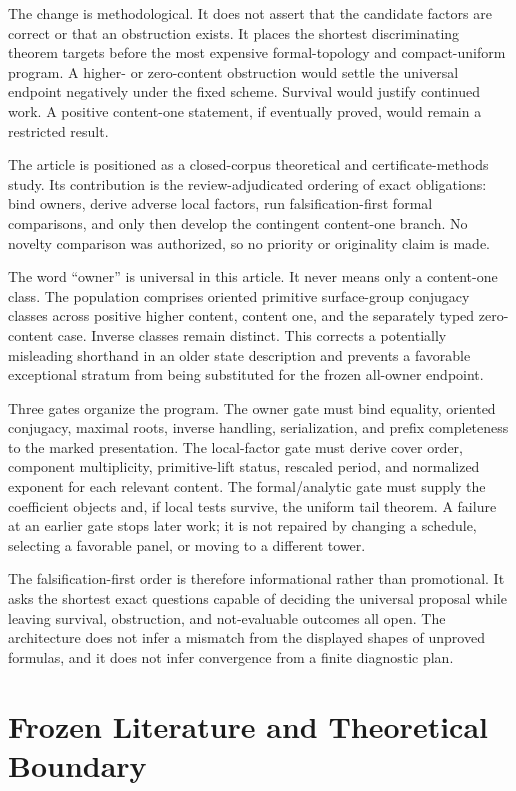 \documentclass[11pt]{article}
\begin{document}
The change is methodological. It does not assert that the candidate
factors are correct or that an obstruction exists. It places the
shortest discriminating theorem targets before the most expensive
formal-topology and compact-uniform program. A higher- or zero-content
obstruction would settle the universal endpoint negatively under the
fixed scheme. Survival would justify continued work. A positive
content-one statement, if eventually proved, would remain a restricted
result.

The article is positioned as a closed-corpus theoretical and
certificate-methods study. Its contribution is the review-adjudicated
ordering of exact obligations: bind owners, derive adverse local
factors, run falsification-first formal comparisons, and only then
develop the contingent content-one branch. No novelty comparison was
authorized, so no priority or originality claim is made.

The word ``owner'' is universal in this article. It never means only a
content-one class. The population comprises oriented primitive
surface-group conjugacy classes across positive higher content, content
one, and the separately typed zero-content case. Inverse classes remain
distinct. This corrects a potentially misleading shorthand in an older
state description and prevents a favorable exceptional stratum from
being substituted for the frozen all-owner endpoint.

Three gates organize the program. The owner gate must bind equality,
oriented conjugacy, maximal roots, inverse handling, serialization, and
prefix completeness to the marked presentation. The local-factor gate
must derive cover order, component multiplicity, primitive-lift status,
rescaled period, and normalized exponent for each relevant content. The
formal/analytic gate must supply the coefficient objects and, if local
tests survive, the uniform tail theorem. A failure at an earlier gate
stops later work; it is not repaired by changing a schedule, selecting a
favorable panel, or moving to a different tower.

The falsification-first order is therefore informational rather than
promotional. It asks the shortest exact questions capable of deciding
the universal proposal while leaving survival, obstruction, and
not-evaluable outcomes all open. The architecture does not infer a
mismatch from the displayed shapes of unproved formulas, and it does not
infer convergence from a finite diagnostic plan.

\hypertarget{2-frozen-literature-and-theoretical-boundary}{%
\section{Frozen Literature and Theoretical
Boundary}\label{2-frozen-literature-and-theoretical-boundary}}
\end{document}
